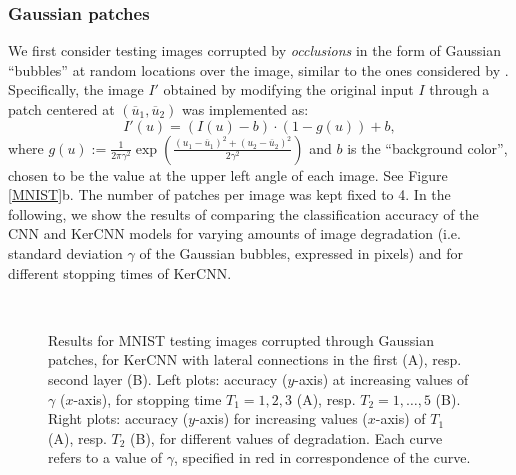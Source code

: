 \documentclass[11pt,oneside,reqno]{amsart}
\renewcommand{\baselinestretch}{1.5} \interfootnotelinepenalty=10000
\begin{document}
 \subsubsection{Gaussian patches} We first consider testing images corrupted by \emph{occlusions} in the form of Gaussian ``bubbles'' at random locations over the image, similar to the ones considered by \citet{tang}. Specifically, the image $I'$ obtained by modifying the original input $I$ through a patch centered at $(\overline{u}_1,\overline{u}_2)$ was implemented as:
  \[I'(u)=(I(u)-b)\cdot (1-g(u)) + b,\]
  where $g(u) := \frac{1}{2\pi\gamma^2}\exp\left(\frac{(u_1-\overline{u}_1)^2+(u_2-\overline{u}_2)^2}{2\gamma^2}\right)$ and $b$ is the ``background color'', chosen to be the value at the upper left angle of each image. See Figure \ref{MNIST}b. The number of patches per image was kept fixed to 4. In the following, we show the results of comparing the classification accuracy of the CNN and KerCNN models for varying amounts of image degradation (i.e. standard deviation $\gamma$ of the Gaussian bubbles, expressed in pixels) and for different stopping times of KerCNN.\\
 \begin{figure}[htbp!]
 \centering
 {\renewcommand{\baselinestretch}{0}
 \\
 }
 \caption{Results for MNIST testing images corrupted through Gaussian patches, for KerCNN with lateral connections in the first (A), resp. second layer (B). Left plots: accuracy ($y$-axis) at increasing values of $\gamma$ ($x$-axis), for stopping time $T_1=1,2,3$ (A), resp. $T_2=1,\ldots,5$ (B). Right plots: accuracy ($y$-axis) for increasing values ($x$-axis) of $T_1$ (A), resp. $T_2$ (B), for different values of degradation. Each curve refers to a value of $\gamma$, specified in red in correspondence of the curve.}\label{bubbles}
 \end{figure}
 
\end{document}
